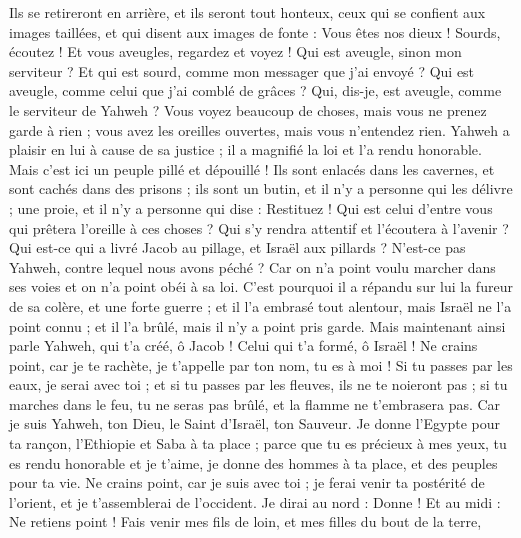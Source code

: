 \begin{multicols}{2}
Ils se retireront en arrière, et ils seront tout honteux, ceux qui se confient aux images taillées, et qui disent aux images de fonte : Vous êtes nos dieux !
Sourds, écoutez ! Et vous aveugles, regardez et voyez !
Qui est aveugle, sinon mon serviteur ? Et qui est sourd, comme mon messager que j'ai envoyé ? Qui est aveugle, comme celui que j'ai comblé de grâces ? Qui, dis-je, est aveugle, comme le serviteur de Yahweh ?
Vous voyez beaucoup de choses, mais vous ne prenez garde à rien ; vous avez les oreilles ouvertes, mais vous n'entendez rien.
Yahweh a plaisir en lui à cause de sa justice ; il a magnifié la loi et l'a  rendu honorable. 
Mais c'est ici un peuple pillé et dépouillé ! Ils sont enlacés dans les cavernes, et sont cachés dans des prisons ; ils sont un butin, et il n'y a personne qui les délivre ; une proie, et il n'y a personne qui dise : Restituez !
Qui est celui d'entre vous qui prêtera l'oreille à ces choses ? Qui s'y rendra attentif et l'écoutera à l'avenir ?
Qui est-ce qui a livré Jacob au pillage, et Israël aux pillards ? N'est-ce pas Yahweh, contre lequel nous avons péché ? Car on n'a point voulu marcher dans ses voies et on n'a point obéi à sa loi.
C'est pourquoi il a répandu sur lui la fureur de sa colère, et une forte guerre ; et il l'a embrasé tout alentour, mais Israël ne l'a point connu ; et il l'a brûlé, mais il n'y a point pris garde.
\VerseOne{}Mais maintenant ainsi parle Yahweh, qui t'a créé, ô Jacob ! Celui qui t'a formé, ô Israël ! Ne crains point, car je te rachète, je t'appelle par ton nom, tu es à moi !
Si tu passes par les eaux, je serai avec toi ; et si tu passes par les fleuves, ils ne te noieront pas ; si tu marches dans le feu, tu ne seras pas brûlé, et la flamme ne t'embrasera pas.
Car je suis Yahweh, ton Dieu, le Saint d'Israël, ton Sauveur. Je donne l'Egypte pour ta rançon, l'Ethiopie et Saba à ta place ;
parce que tu es précieux à mes yeux, tu es rendu honorable et je t'aime, je donne des hommes à ta place, et des peuples pour ta vie.
Ne crains point, car je suis avec toi ; je ferai venir ta postérité de l'orient, et je t'assemblerai de l'occident.
Je dirai au nord : Donne ! Et au midi : Ne retiens point ! Fais venir mes fils de loin, et mes filles du bout de la terre,

\end{multicols}
